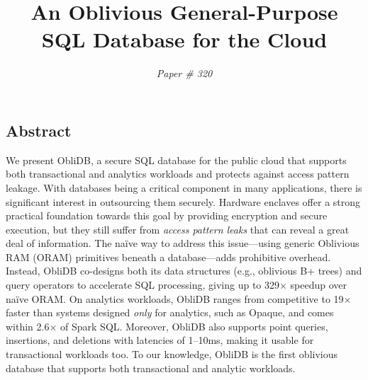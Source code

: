 \documentclass[letterpaper,twocolumn,10pt]{article}
\newcommand{\ignore}[1]{}
\def\name/{ObliDB}
\begin{document}
\date{\vspace{-0.9cm}}

\setlength{\droptitle}{-1.1cm}

\title{\Large \bf An Oblivious General-Purpose SQL Database for the Cloud\vspace{-0.1cm}}

\author{\emph{Paper \# 320}}

\ignore{
\author{
{\rm Your N.\ Here}\\
Your Institution
\and
{\rm Second Name}\\
Second Institution
} %
}
\maketitle



\subsection*{Abstract}
We present \name/, a secure SQL database for the public cloud that supports both transactional and analytics workloads and protects against access pattern leakage.
With databases being a critical component in many applications, there is significant
interest in outsourcing them securely.
Hardware enclaves offer a strong practical foundation towards this goal by providing encryption and secure execution, but they still suffer from \emph{access pattern leaks} that can reveal a great deal of information.
The na\"ive way to address this issue---using generic Oblivious RAM (ORAM) primitives beneath a database---adds prohibitive overhead.
Instead, \name/ co-designs both its data structures (e.g., oblivious B+ trees) and query operators to accelerate SQL processing, giving up to 329$\times$ speedup over na\"ive ORAM.
On analytics workloads, \name/ ranges from competitive to 19$\times$ faster than systems designed \emph{only} for analytics, such as Opaque, and comes within 2.6$\times$ of Spark SQL.
Moreover, \name/ also supports point queries, insertions, and deletions with latencies of 1--10ms, making it usable for transactional workloads too. To our knowledge, \name/ is the first oblivious database that supports both transactional and analytic workloads.
\end{document}
